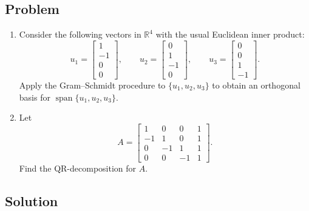 \documentclass[12pt]{article}
\newcommand{\R}{\mathbb{R}}
\newcommand{\Span}{\operatorname{span}}
\begin{document}
\subsection{Problem}
\begin{enumerate}[label=(\alph*)]
  \item Consider the following vectors in $\R^4$ with the usual Euclidean inner product:
  \[
  u_1=\begin{bmatrix}1\\-1\\0\\0\end{bmatrix},
  \qquad
  u_2=\begin{bmatrix}0\\1\\-1\\0\end{bmatrix},
  \qquad
  u_3=\begin{bmatrix}0\\0\\1\\-1\end{bmatrix}.
  \]
  Apply the Gram--Schmidt procedure to $\{u_1,u_2,u_3\}$ to obtain an orthogonal basis for $\Span\{u_1,u_2,u_3\}$.
  \item Let
  \[
  A=\begin{bmatrix}
  1&0&0&1\\
  -1&1&0&1\\
  0&-1&1&1\\
  0&0&-1&1
  \end{bmatrix}.
  \]
  Find the QR-decomposition for $A$.
\end{enumerate}

\newpage
\subsection{Solution}
\end{document}

